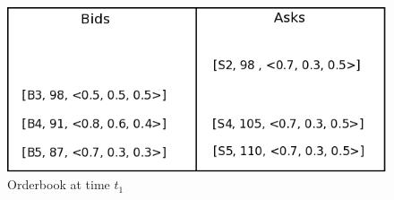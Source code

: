 \documentclass[10pt,journal,compsoc]{IEEEtran}
\begin{document}
\begin{figure}
\includegraphics[scale=0.31]{drawings/orderbook-after-one-pass.png}
\caption{Orderbook at time $t_{1}$}
\label{orderbook-after-one-pass}
\end{figure}

\end{document}
